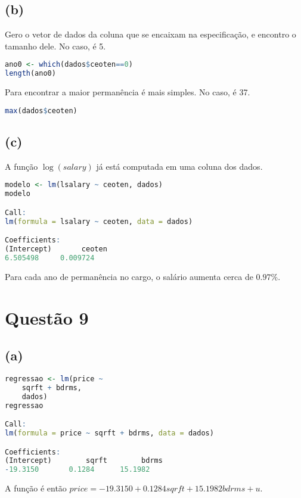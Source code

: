 \documentclass[12pt]{article}
\begin{document}
\subsection*{(b)}

Gero o vetor de dados da coluna que se encaixam na especificação, e encontro o tamanho dele. No caso, é 5.

\begin{lstlisting}[language=R]
ano0 <- which(dados$ceoten==0)
length(ano0)
\end{lstlisting}

Para encontrar a maior permanência é mais simples. No caso, é 37.

\begin{lstlisting}[language=R]
max(dados$ceoten)
\end{lstlisting}

\subsection*{(c)}
A função $\log (salary)$ já está computada em uma coluna dos dados.

\begin{lstlisting}[language=R]
modelo <- lm(lsalary ~ ceoten, dados)
modelo

Call:
lm(formula = lsalary ~ ceoten, data = dados)

Coefficients:
(Intercept)       ceoten  
6.505498     0.009724  
\end{lstlisting}

Para cada ano de permanência no cargo, o salário aumenta cerca de $0.97\%$.

\section*{Questão 9}

\subsection*{(a)}

\begin{lstlisting}[language=R]
regressao <- lm(price ~ 
	sqrft + bdrms,
	dados)
regressao

Call:
lm(formula = price ~ sqrft + bdrms, data = dados)

Coefficients:
(Intercept)        sqrft        bdrms  
-19.3150       0.1284      15.1982
\end{lstlisting}

A função é então $price=-19.3150+0.1284sqrft+15.1982bdrms+u$.
\end{document}
